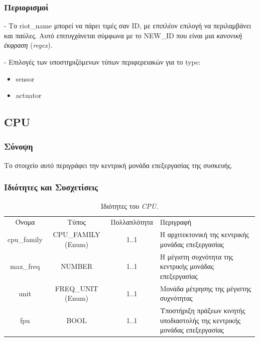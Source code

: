 \subsubsection*{Περιορισμοί}

\noindent - Το riot\_name μπορεί να πάρει τιμές σαν ID, με επιπλέον επιλογή να περιλαμβάνει και παύλες. Αυτό επιτυγχάνεται σύμφωνα με το NEW\_ID που είναι μια \textit{κανονική έκφραση} (\textit{regex}).

\noindent - Επιλογές των υποστηριζόμενων τύπων περιφερειακών για το type:

\begin{itemize}
	\item sensor
	\item actuator
\end{itemize}

\subsection{CPU}
\label{subsec:cpu}

\subsubsection*{Σύνοψη}

\noindent Το στοιχείο αυτό περιγράφει την κεντρική μονάδα επεξεργασίας της συσκευής.

\subsubsection*{Ιδιότητες και Συσχετίσεις}

\begin{table}[H]
	\begin{center}
		\begin{tabular}{ | c | c | c| m{5.5cm} | }
			\hline
			\rowcolor{Gray}
			\multicolumn{4}{|c|}{\textbf{Ιδιότητες}}\\
			\hline
			\rowcolor{Gray}
			Όνομα & Τύπος & Πολλαπλότητα & Περιγραφή \\
			\hline
			cpu\_family & CPU\_FAMILY (Enum) & 1..1 & Η αρχιτεκτονική της κεντρικής μονάδας επεξεργασίας \\
			\hline
			max\_freq & NUMBER & 1..1 & Η μέγιστη συχνότητα της κεντρικής μονάδας επεξεργασίας \\
			\hline
			unit & FREQ\_UNIT (Enum) & 1..1 & Μονάδα μέτρησης της μέγιστης συχνότητας \\
			\hline
			fpu & BOOL & 1..1 & Υποστήριξη πράξεων κινητής υποδιαστολής της κεντρικής μονάδας επεξεργασίας \\
			\hline
		\end{tabular}
		\caption{Ιδιότητες του \textit{CPU}.}
		\label{tab:cpu}
	\end{center}
\end{table}

